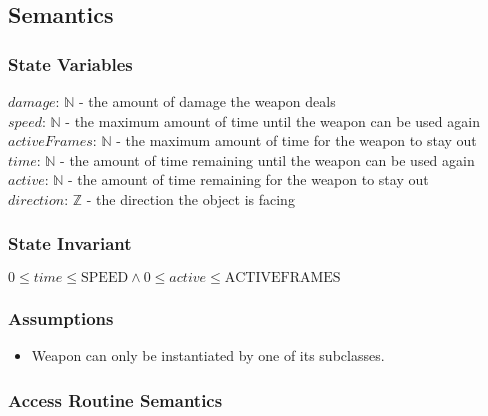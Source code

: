 \documentclass[12pt]{article}
\begin{document}
\subsection*{Semantics}

\subsubsection*{State Variables}

$damage$: $\mathbb{N}$ - the amount of damage the weapon deals\\
$speed$: $\mathbb{N}$ - the maximum amount of time until the weapon can be used again\\
$activeFrames$: $\mathbb{N}$ - the maximum amount of time for the weapon to stay out\\
$time$: $\mathbb{N}$ - the amount of time remaining until the weapon can be used again\\
$active$: $\mathbb{N}$ - the amount of time remaining for the weapon to stay out\\
$direction$: $\mathbb{Z}$ - the direction the object is facing

\subsubsection*{State Invariant}

$0 \leq time \leq \text{SPEED} \land 0 \leq active \leq \text{ACTIVEFRAMES}$

\subsubsection*{Assumptions}

\begin{itemize}
    \item Weapon can only be instantiated by one of its subclasses.
\end{itemize}

\subsubsection*{Access Routine Semantics}
\end{document}
